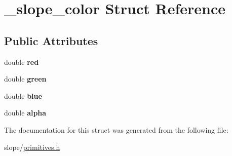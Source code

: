 \hypertarget{struct__slope__color}{\section{\+\_\+slope\+\_\+color Struct Reference}
\label{struct__slope__color}
}
\subsection*{Public Attributes}
\begin{DoxyCompactItemize}
\item 
\hypertarget{struct__slope__color_a60da10285eeb49ea6034ac17a57da392}{double {\bfseries red}}\label{struct__slope__color_a60da10285eeb49ea6034ac17a57da392}

\item 
\hypertarget{struct__slope__color_a55c83d2d5c5544b3a1d2f7f4d1ba61bd}{double {\bfseries green}}\label{struct__slope__color_a55c83d2d5c5544b3a1d2f7f4d1ba61bd}

\item 
\hypertarget{struct__slope__color_afee1fcbd756e46aeea378b04891aeca9}{double {\bfseries blue}}\label{struct__slope__color_afee1fcbd756e46aeea378b04891aeca9}

\item 
\hypertarget{struct__slope__color_a414331ed39d666ff58868b2c627bc3e3}{double {\bfseries alpha}}\label{struct__slope__color_a414331ed39d666ff58868b2c627bc3e3}

\end{DoxyCompactItemize}


The documentation for this struct was generated from the following file\+:\begin{DoxyCompactItemize}
\item 
slope/\hyperlink{primitives_8h}{primitives.\+h}\end{DoxyCompactItemize}
